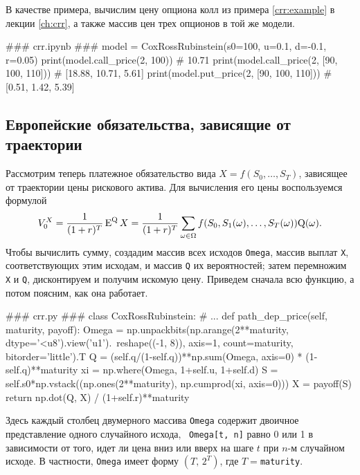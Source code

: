 В качестве примера, вычислим цену опциона колл из примера \ref{crr:example} в лекции \ref{ch:crr}, а также массив цен трех опционов в той же модели.
\begin{python}
### crr.ipynb ###
model = CoxRossRubinstein(s0=100, u=0.1, d=-0.1, r=0.05)
print(model.call_price(2, 100))             # 10.71
print(model.call_price(2, [90, 100, 110]))  # [18.88, 10.71, 5.61]
print(model.put_price(2, [90, 100, 110]))   # [0.51, 1.42, 5.39]
\end{python}


\subsection{Европейские обязательства, зависящие от траектории}
\label{pr-crr:s:path-dep}
Рассмотрим теперь платежное обязательство вида $X = f(S_0,\dots,S_T)$, зависящее от траектории цены рискового актива. 
Для вычисления его цены воспользуемся формулой
\[
V_0^X = \frac1{(1+r)^T} \operatorname{E}^{\mathrm{Q}} X = \frac1{(1+r)^T} \sum_{\omega\in\Omega} f(S_0, S_1(\omega),\dots,S_T(\omega)) \mathrm{Q}(\omega).
\]
Чтобы вычислить сумму, создадим массив всех исходов \verb"Omega", массив выплат \verb"X", соответствующих этим исходам, и массив \verb"Q" их вероятностей; затем перемножим \verb"X" и \verb"Q", дисконтируем и получим искомую цену.
Приведем сначала всю функцию, а потом поясним, как она работает.
\begin{python}
### crr.py ###
class CoxRossRubinstein:
    # ...
    def path_dep_price(self, maturity, payoff):
        Omega = np.unpackbits(np.arange(2**maturity, dtype='<u8').view('u1').\
            reshape((-1, 8)), axis=1, count=maturity, bitorder='little').T
        Q  = (self.q/(1-self.q))**np.sum(Omega, axis=0) * (1-self.q)**maturity
        xi = np.where(Omega, 1+self.u, 1+self.d)
        S = self.s0*np.vstack((np.ones(2**maturity), np.cumprod(xi, axis=0)))
        X = payoff(S)
        return np.dot(Q, X) / (1+self.r)**maturity
\end{python}

Здесь каждый столбец двумерного массива \verb"Omega" содержит двоичное представление одного случайного исхода, \te\ \verb"Omega[t, n]" равно 0 или 1 в зависимости от того, идет ли цена вниз или вверх на шаге $t$ при $n$-м случайном исходе.
В частности, \verb"Omega" имеет форму $(T,\, 2^T)$, где $T=$\;\verb"maturity".

